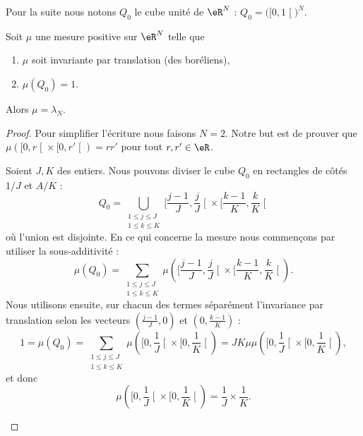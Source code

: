 Pour la suite nous notons \( Q_0\) le cube unité de \( \eR^N\) : \( Q_0=\big( \mathopen[ 0 , 1 \mathclose[ \big)^N\).

\begin{theorem}        \label{ThoCABFooHbUzWc}
    Soit \( \mu\) une mesure positive sur \( \eR^N\) telle que
    \begin{enumerate}
        \item
            \( \mu\) soit invariante par translation (des boréliens),
        \item
            \( \mu(Q_0)=1\).
    \end{enumerate}
    Alors \( \mu=\lambda_N\).
\end{theorem}

\begin{proof}
    Pour simplifier l'écriture nous faisons \( N=2\). Notre but est de prouver que \( \mu(  \mathopen[ 0 , r \mathclose[\times \mathopen[ 0 , r' \mathclose[ )=rr'\) pour tout \( r,r'\in \eR\).

    \begin{subproof}
    \item[Longueur =\( 1/J\)]
        Soient \( J,K\) des entiers. Nous pouvons diviser le cube \( Q_0\) en rectangles de côtés \( 1/J\) et \( A/K\) :
        \begin{equation}
            Q_0=\bigcup_{\substack{1\leq j\leq J\\1\leq k\leq K}}\mathopen[ \frac{ j-1 }{ J } , \frac{ j }{ J } \mathclose[\times \mathopen[ \frac{ k-1 }{ K } , \frac{ k }{ K } \mathclose[
        \end{equation}
        où l'union est disjointe. En ce qui concerne la mesure nous commençons par utiliser la sous-additivité :
        \begin{equation}
            \mu(Q_0)=\sum_{\substack{1\leq j\leq J\\1\leq k\leq K}}\mu\left(  \mathopen[ \frac{ j-1 }{ J } , \frac{ j }{ J } \mathclose[\times \mathopen[ \frac{ k-1 }{ K } , \frac{ k }{ K } \mathclose[      \right).
        \end{equation}
        Nous utilisons ensuite, sur chacun des termes séparément l'invariance par translation selon les vecteurs \( (\frac{ j-1 }{ J },0)\) et \( ( 0,\frac{ k-1 }{ K } )\) :
        \begin{equation}
            1=\mu(Q_0)=\sum_{\substack{1\leq j\leq J\\1\leq k\leq K}}\mu\left(  \mathopen[ 0,\frac{1}{ J } \mathclose[\times \mathopen[0,\frac{1}{ K }\mathclose[      \right)=JK\mu\mu\left(  \mathopen[ 0,\frac{1}{ J } \mathclose[\times \mathopen[0,\frac{1}{ K }\mathclose[      \right),
        \end{equation}
        et donc
        \begin{equation}
            \mu\left(  \mathopen[ 0,\frac{1}{ J } \mathclose[\times \mathopen[0,\frac{1}{ K }\mathclose[      \right)=\frac{1}{ J }\times \frac{1}{ K }.
        \end{equation}
    \item[Longueur \( L/K\)]


\end{subproof}
\end{proof}
